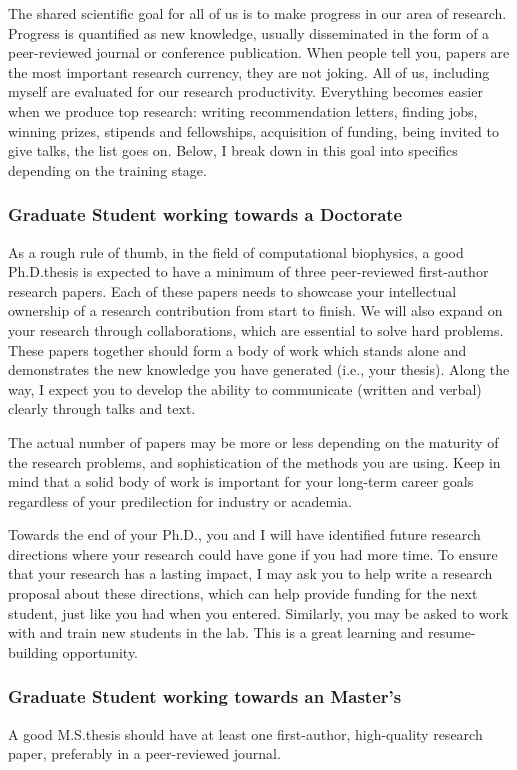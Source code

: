 \documentclass[12pt]{article}
\begin{document}
The shared scientific goal for all of us is to make progress in our area of research.
Progress is quantified as new knowledge, usually disseminated in the form of a peer-reviewed journal or conference publication.
When people tell you, papers are the most important research currency, they are not joking.
All of us, including myself are evaluated for our research productivity.
Everything becomes easier when we produce top research: writing recommendation letters, finding jobs, winning prizes, stipends and fellowships, acquisition of funding, being invited to give talks, the list goes on.
Below, I break down in this goal into specifics depending on the training stage.

\subsubsection{Graduate Student working towards a Doctorate}

As a rough rule of thumb, in the field of computational biophysics, a good Ph.D.\@ thesis is expected to have a minimum of three peer-reviewed first-author research papers.
Each of these papers needs to showcase your intellectual ownership of a research contribution from start to finish.
We will also expand on your research through collaborations, which are essential to solve hard problems.
These papers together should form a body of work which stands alone and demonstrates the new knowledge you have generated (i.e., your thesis).
Along the way, I expect you to develop the ability to communicate (written and verbal) clearly through talks and text.

The actual number of papers may be more or less depending on the maturity of the research problems, and sophistication of the methods you are using.
Keep in mind that a solid body of work is important for your long-term career goals regardless of your predilection for industry or academia.

Towards the end of your Ph.D., you and I will have identified future research directions where your research could have gone if you had more time.
To ensure that your research has a lasting impact, I may ask you to help write a research proposal about these directions, which can help provide funding for the next student, just like you had when you entered.
Similarly, you may be asked to work with and train new students in the lab.
This is a great learning and resume-building opportunity.

\subsubsection{Graduate Student working towards an Master's}
A good M.S.\@ thesis should have at least one first-author, high-quality research paper, preferably in a peer-reviewed journal.
\end{document}

